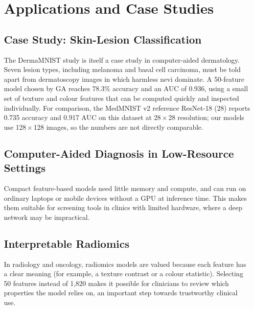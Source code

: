 \documentclass[12pt,a4paper]{report}
\begin{document}
\chapter{Applications and Case Studies}

\section{Case Study: Skin-Lesion Classification}
The DermaMNIST study is itself a case study in computer-aided dermatology. Seven lesion types, including melanoma
and basal cell carcinoma, must be told apart from dermatoscopy images in which harmless nevi dominate. A 50-feature
model chosen by GA reaches 78.3\% accuracy and an AUC of 0.936, using a small set of texture and colour features that
can be computed quickly and inspected individually. For comparison, the MedMNIST v2 reference ResNet-18 (28) reports
0.735 accuracy and 0.917 AUC on this dataset at 28\,$\times$\,28 resolution; our models use 128\,$\times$\,128
images, so the numbers are not directly comparable.

\section{Computer-Aided Diagnosis in Low-Resource Settings}
Compact feature-based models need little memory and compute, and can run on ordinary laptops or mobile devices
without a GPU at inference time. This makes them suitable for screening tools in clinics with limited hardware,
where a deep network may be impractical.

\section{Interpretable Radiomics}
In radiology and oncology, radiomics models are valued because each feature has a clear meaning (for example, a
texture contrast or a colour statistic). Selecting 50 features instead of 1,820 makes it possible for clinicians to
review which properties the model relies on, an important step towards trustworthy clinical use.
\end{document}
